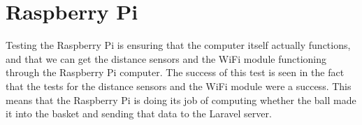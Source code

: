 \section{Raspberry Pi}
Testing the Raspberry Pi is ensuring that the computer itself actually functions, and that we can get the distance sensors and the WiFi module functioning through the Raspberry Pi computer. The success of this test is seen in the fact that the tests for the distance sensors and the WiFi module were a success. This means that the Raspberry Pi is doing its job of computing whether the ball made it into the basket and sending that data to the Laravel server.
